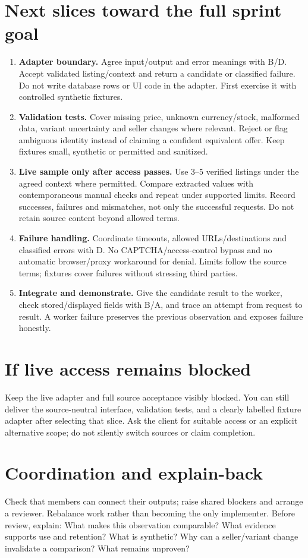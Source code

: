 \section*{Next slices toward the full sprint goal}
\begin{enumerate}
\item \textbf{Adapter boundary.} Agree input/output and error meanings with B/D. Accept validated listing/context and return a candidate or classified failure. Do not write database rows or UI code in the adapter. First exercise it with controlled synthetic fixtures.
\item \textbf{Validation tests.} Cover missing price, unknown currency/stock, malformed data, variant uncertainty and seller changes where relevant. Reject or flag ambiguous identity instead of claiming a confident equivalent offer. Keep fixtures small, synthetic or permitted and sanitized.
\item \textbf{Live sample only after access passes.} Use 3--5 verified listings under the agreed context where permitted. Compare extracted values with contemporaneous manual checks and repeat under supported limits. Record successes, failures and mismatches, not only the successful requests. Do not retain source content beyond allowed terms.
\item \textbf{Failure handling.} Coordinate timeouts, allowed URLs/destinations and classified errors with D. No CAPTCHA/access-control bypass and no automatic browser/proxy workaround for denial. Limits follow the source terms; fixtures cover failures without stressing third parties.
\item \textbf{Integrate and demonstrate.} Give the candidate result to the worker, check stored/displayed fields with B/A, and trace an attempt from request to result. A worker failure preserves the previous observation and exposes failure honestly.
\end{enumerate}
\section*{If live access remains blocked}
Keep the live adapter and full source acceptance visibly blocked. You can still deliver the source-neutral interface, validation tests, and a clearly labelled fixture adapter after selecting that slice. Ask the client for suitable access or an explicit alternative scope; do not silently switch sources or claim completion.
\section*{Coordination and explain-back}
Check that members can connect their outputs; raise shared blockers and arrange a reviewer. Rebalance work rather than becoming the only implementer. Before review, explain: What makes this observation comparable? What evidence supports use and retention? What is synthetic? Why can a seller/variant change invalidate a comparison? What remains unproven?
\sharedfinish
